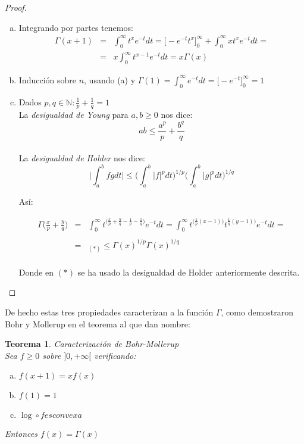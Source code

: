 \documentclass[a4paper, 11pt]{amsart}
\newtheorem{theorem}{Teorema}[section]
\theoremstyle{definition}
\theoremstyle{remark}
\numberwithin{equation}{section}
\begin{document}
   \begin{proof}

     \begin{enumerate}[(a)]
      \item Integrando por partes tenemos:
	\begin{eqnarray*}
	\Gamma(x+1) &=& \int_0^{\infty}{t^{x}e^{-t}dt} = \bigg[-e^{-t}t^x\bigg]_0^{\infty} +
	  \int_0^{\infty}{xt^xe^{-t}dt} = \\
	  & = & x\int_0^{\infty}{t^{x-1}e^{-t}dt} = x\Gamma(x)
	\end{eqnarray*}
      \item Inducción sobre $n$, usando (a) y $\Gamma(1) = \int_0^{\infty}{e^{-t}dt} = 
	\bigg[-e^{-t}\bigg]_0^{\infty} = 1 $
      \item Dados $p,q \in \mathbb{N} : \frac{1}{p} + \frac{1}{q} = 1$\\
      
	La \textit{desigualdad de Young} para $a,b \ge 0$ nos dice: 
	  $$ab \le \frac{a^p}{p} + \frac{b^q}{q}$$\\
	La \textit{desigualdad de Holder} nos dice: 
	  $$\bigg|\int_a^b {fg dt}\bigg| \le 
	  \bigg(\int_a^b {|f|^p dt}\bigg)^{1/p} \bigg(\int_a^b {|g|^p dt}\bigg)^{1/q}$$
	  
	Así:
	
	\begin{eqnarray*}
	 \Gamma\bigg(\frac{x}{p} +\frac{y}{q}\bigg) & = & 
	    \int_0^{\infty}{t^{\big(\frac{x}{p}+\frac{y}{q}
	    -\frac{1}{p}-\frac{1}{q}\big)}e^{-t}dt} 
	    =\int_0^{\infty}{t^{\big(\frac{1}{p}(x-1)\big)} t^{\frac{1}{q}(y-1)\big)}e^{-t}dt} =\\
	    \\
	 & = &_{(*)} \le \Gamma(x)^{1/p}\Gamma(x)^{1/q}
	\end{eqnarray*}\\
	
	Donde en $(*)$ se ha usado la desigualdad de Holder anteriormente descrita.

     \end{enumerate}
      
    \end{proof}
  
  De hecho estas tres propiedades caracterizan a la función $\Gamma$, como demostraron Bohr y
  Mollerup en el teorema al que dan nombre:
      
  \begin{theorem}{Caracterización de Bohr-Mollerup}\\
  
  Sea $f\ge 0$ sobre $]0,+\infty[$ verificando:
  
  \begin{enumerate}[(a)]
   \item $f(x+1) = xf(x)$
   \item $f(1) = 1$
   \item $\log \circ f es convexa$
  \end{enumerate}
  
   Entonces $f(x) = \Gamma(x)$
   
  \end{theorem}
\end{document}
